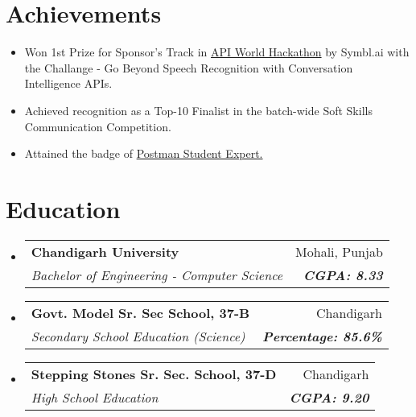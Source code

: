\documentclass[apaper,20pt]{article}
\makeatletter
\newcommand{\MYhref}[3][primaryColor]{\href{#2}{{\color{#1}#3}}}
\newcommand{\resumeSubheading}[4]{
  \vspace{-1pt}\item
    \begin{tabular*}{0.97\textwidth}{l@{\extracolsep{\fill}}r}
      \textbf{#1} & #2 \\
      \textit{#3} & \textit{#4} \\
    \end{tabular*}\vspace{-5pt}
}
\newcommand{\resumeSubHeadingListStart}{\begin{itemize}[leftmargin=*]}
\newcommand{\resumeSubHeadingListEnd}{\end{itemize}}
\makeatother
\begin{document}

\vspace{-3pt}

\section{Achievements}
\begin{itemize}[labelsep=*,label=$\circ$,leftmargin=0.9pc]
	\item {Won 1st Prize for Sponsor's Track in {\MYhref{https://devpost.com/software/feedback-prime-kbg8um}{API World Hackathon}} by Symbl.ai with the Challange - Go Beyond Speech Recognition with Conversation Intelligence APIs.}
 \vspace{-5pt}
     \item {Achieved recognition as a Top-10 Finalist in the batch-wide Soft Skills Communication Competition.}
\vspace{-5pt}
	\item {Attained the badge of {\MYhref{https://badgr.com/public/assertions/DNG85AU6SYWaX6XO5gkoDw?identity__email=nitish.sharma1186@gmail.com}{Postman Student Expert.}}}
\end{itemize}


\vspace{-6pt}

\section{Education}
\resumeSubHeadingListStart
\resumeSubheading
{Chandigarh University}{Mohali, Punjab}
{Bachelor of Engineering - Computer Science}{\textbf{CGPA: 8.33}}
\vspace{0pt}
\resumeSubheading
{Govt. Model Sr. Sec School, 37-B}{Chandigarh}
{Secondary School Education (Science)}{\textbf{Percentage: 85.6\%}}
\vspace{0pt}
\resumeSubheading
{Stepping Stones Sr. Sec. School, 37-D}{Chandigarh}
{High School Education}{\textbf{CGPA: 9.20}}
\resumeSubHeadingListEnd
\end{document}

